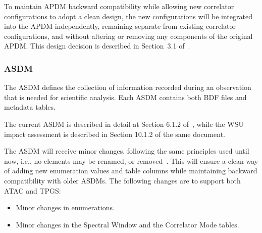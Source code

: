 To maintain APDM backward compatibility while allowing new correlator configurations to adopt a clean design, the new configurations will be integrated into the APDM independently, remaining separate from existing correlator configurations, and without altering or removing any components of the original APDM. This design decision is described in Section~3.1 of~\cite{apdm}.

\subsubsection{ASDM}
\label{ASDMchanges}
The \ac{ASDM} defines the collection of information recorded during an observation that is needed for scientific analysis. Each ASDM contains both \ac{BDF} files and metadata tables.

The current ASDM is described in detail at Section 6.1.2 of~\cite{CSA-IA}, while the WSU impact assessment is described in Section 10.1.2 of the same document.


The ASDM will receive minor changes, following the same principles used until now, i.e., no elements may be renamed, or removed~\cite{tsiReport}. This will ensure a clean way of adding new enumeration values and table columns while maintaining backward compatibility with older ASDMs. The following changes are to support both ATAC and TPGS:

\begin{itemize}[itemsep=-0.5em]
    \item Minor changes in enumerations.
    \item Minor changes in the Spectral Window and the Correlator Mode tables.
\end{itemize}

